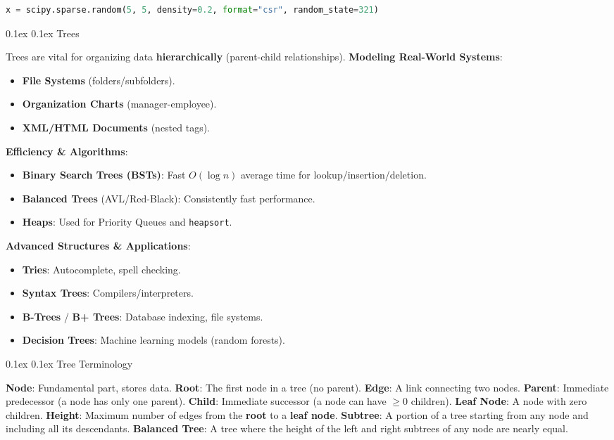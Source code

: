 \documentclass[8pt,landscape]{article}
\makeatletter
\renewcommand{\subsection}{\@startsection{subsection}{2}{0pt}%
    {0.1ex}%
    {0.1ex}%
    {\fontsize{8}{9}\bfseries\color{blue}}} %
\newcommand{\code}[1]{\textcolor{myred}{\texttt{#1}}}
\newcommand{\smalltext}[1]{%
  {\fontsize{8}{9}\selectfont\sloppy #1\par}%
}
\makeatother
\begin{document}
\begin{multicols}{3}
\begin{lstlisting}[language=Python]
x = scipy.sparse.random(5, 5, density=0.2, format="csr", random_state=321)
\end{lstlisting}


\subsection{Trees}
\smalltext{
Trees are vital for organizing data \textbf{hierarchically} (parent-child relationships).
\textbf{Modeling Real-World Systems}:
\begin{itemize}[noitemsep, nolistsep, leftmargin=1em]
    \item \textbf{File Systems} (folders/subfolders).
    \item \textbf{Organization Charts} (manager-employee).
    \item \textbf{XML/HTML Documents} (nested tags).
\end{itemize}
\textbf{Efficiency \& Algorithms}:
\begin{itemize}[noitemsep, nolistsep, leftmargin=1em]
    \item \textbf{Binary Search Trees (BSTs)}: Fast $O(\log n)$ average time for lookup/insertion/deletion.
    \item \textbf{Balanced Trees} (AVL/Red-Black): Consistently fast performance.
    \item \textbf{Heaps}: Used for Priority Queues and \code{heapsort}.
\end{itemize}
\textbf{Advanced Structures \& Applications}:
\begin{itemize}[noitemsep, nolistsep, leftmargin=1em]
    \item \textbf{Tries}: Autocomplete, spell checking.
    \item \textbf{Syntax Trees}: Compilers/interpreters.
    \item \textbf{B-Trees} / \textbf{B+ Trees}: Database indexing, file systems.
    \item \textbf{Decision Trees}: Machine learning models (random forests).
\end{itemize}
}
\subsection{Tree Terminology}
\smalltext{
\textbf{Node}: Fundamental part, stores data.
\textbf{Root}: The first node in a tree (no parent).
\textbf{Edge}: A link connecting two nodes.
\textbf{Parent}: Immediate predecessor (a node has only one parent).
\textbf{Child}: Immediate successor (a node can have $\geq 0$ children).
\textbf{Leaf Node}: A node with zero children.
\textbf{Height}: Maximum number of edges from the \textbf{root} to a \textbf{leaf node}.
\textbf{Subtree}: A portion of a tree starting from any node and including all its descendants.
\textbf{Balanced Tree}: A tree where the height of the left and right subtrees of any node are nearly equal.
}


\end{multicols}
\end{document}
